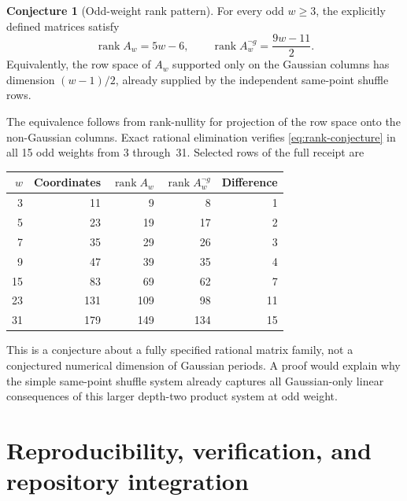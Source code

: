 \documentclass[11pt,a4paper]{article}
\numberwithin{equation}{section}
\theoremstyle{definition}
\newtheorem{conjecture}[theorem]{Conjecture}
\theoremstyle{remark}
\newcommand{\rank}{\operatorname{rank}}
\begin{document}
\begin{conjecture}[Odd-weight rank pattern]\label{conj:rank}
For every odd $w\ge3$, the explicitly defined matrices satisfy
\begin{equation}\label{eq:rank-conjecture}
 \rank A_w=5w-6,\qquad
 \rank A_w^{\neg g}=\frac{9w-11}{2}.
\end{equation}
Equivalently, the row space of $A_w$ supported only on the Gaussian columns has dimension $(w-1)/2$, already supplied by the independent same-point shuffle rows.
\end{conjecture}
The equivalence follows from rank-nullity for projection of the row space onto the non-Gaussian columns. Exact rational elimination verifies \eqref{eq:rank-conjecture} in all 15 odd weights from 3 through~31. Selected rows of the full receipt are
\begin{center}
\begin{tabular}{@{}rrrrr@{}}
\toprule
$w$ & Coordinates & $\rank A_w$ & $\rank A_w^{\neg g}$ & Difference\\
\midrule
3&11&9&8&1\\
5&23&19&17&2\\
7&35&29&26&3\\
9&47&39&35&4\\
15&83&69&62&7\\
23&131&109&98&11\\
31&179&149&134&15\\
\bottomrule
\end{tabular}
\end{center}
This is a conjecture about a fully specified rational matrix family, not a conjectured numerical dimension of Gaussian periods. A proof would explain why the simple same-point shuffle system already captures all Gaussian-only linear consequences of this larger depth-two product system at odd weight.

\section{Reproducibility, verification, and repository integration}
\label{sec:verification}
\end{document}
